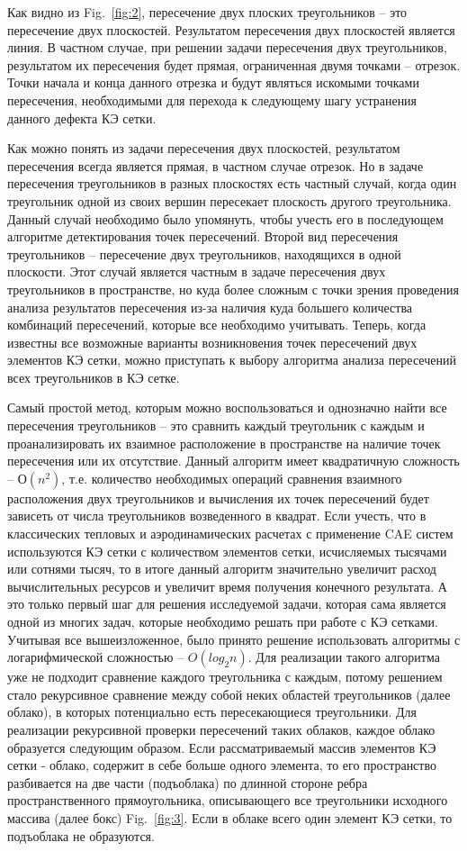 \documentclass[
11pt,%
tightenlines,%
twoside,%
onecolumn,%
nofloats,%
nobibnotes,%
nofootinbib,%
superscriptaddress,%
noshowpacs,%
centertags]%
{revtex4}
\begin{document}
Как видно из Fig.~\ref{fig:2}, пересечение двух плоских треугольников – это пересечение двух плоскостей. Результатом пересечения двух плоскостей является линия. В частном случае, при решении задачи пересечения двух треугольников, результатом их пересечения будет прямая, ограниченная двумя точками – отрезок. Точки начала и конца данного отрезка и будут являться искомыми точками пересечения, необходимыми для перехода к следующему шагу устранения данного дефекта КЭ сетки.

Как можно понять из задачи пересечения двух плоскостей, результатом пересечения всегда является прямая, в частном случае отрезок. Но в задаче пересечения треугольников в разных плоскостях есть частный случай, когда один треугольник одной из своих вершин пересекает плоскость другого треугольника. Данный случай необходимо было упомянуть, чтобы учесть его в последующем алгоритме детектирования точек пересечений.
Второй вид пересечения треугольников – пересечение двух треугольников, находящихся в одной плоскости. Этот случай является частным в задаче пересечения двух треугольников в пространстве, но куда более сложным с точки зрения проведения анализа результатов пересечения из-за наличия куда большего количества комбинаций пересечений, которые все необходимо учитывать. 
Теперь, когда известны все возможные варианты возникновения точек пересечений двух элементов КЭ сетки, можно приступать к выбору алгоритма анализа пересечений всех треугольников в КЭ сетке.

Самый простой метод, которым можно воспользоваться и однозначно найти все пересечения треугольников – это сравнить каждый треугольник с каждым и проанализировать их взаимное расположение в пространстве на наличие точек пересечения или их отсутствие. 
Данный алгоритм имеет квадратичную сложность – $О(n^2)$, т.е. количество необходимых операций сравнения взаимного расположения двух треугольников и вычисления их точек пересечений будет зависеть от числа треугольников возведенного в квадрат. Если учесть, что в классических тепловых и аэродинамических расчетах с применение CAE систем используются КЭ сетки с количеством элементов сетки, исчисляемых тысячами или сотнями тысяч, то в итоге данный алгоритм значительно увеличит расход вычислительных ресурсов и увеличит время получения конечного результата. А это только первый шаг для решения исследуемой задачи, которая сама является одной из многих задач, которые необходимо решать при работе с КЭ сетками.
Учитывая все вышеизложенное, было принято решение использовать алгоритмы с логарифмической сложностью – $O(log_2n)$. Для реализации такого алгоритма уже не подходит сравнение каждого треугольника с каждым, потому решением стало рекурсивное сравнение между собой неких областей треугольников (далее облако), в которых потенциально есть пересекающиеся треугольники.
Для реализации рекурсивной проверки пересечений таких облаков, каждое облако образуется следующим образом. Если рассматриваемый массив элементов КЭ сетки - облако, содержит в себе больше одного элемента, то его пространство разбивается на две части (подъоблака) по длинной стороне ребра пространственного прямоугольника, описывающего все треугольники исходного массива (далее бокс) Fig.~\ref{fig:3}. Если в облаке всего один элемент КЭ сетки, то подъоблака не образуются.
\end{document}
